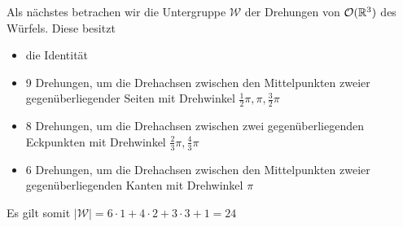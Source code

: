 Als nächstes betrachen wir die Untergruppe $\mathcal{W}$ der Drehungen von ${\mathcal{O}(\mathbb{R}^3)}$ des Würfels. Diese besitzt
\begin{itemize} 
  \item die Identität
  \item 9 Drehungen, um die Drehachsen zwischen den Mittelpunkten zweier gegenüberliegender Seiten mit Drehwinkel $\frac{1}{2}\pi,\pi,\frac{3}{2}\pi$
  \item 8 Drehungen, um die Drehachsen zwischen zwei gegenüberliegenden Eckpunkten mit Drehwinkel $\frac{2}{3}\pi,\frac{4}{3}\pi$
  \item 6 Drehungen, um die Drehachsen zwischen den Mittelpunkten zweier gegenüberliegenden Kanten mit Drehwinkel $\pi$
\end{itemize}
Es gilt somit $|\mathcal{W}|=6 \cdot 1 + 4 \cdot 2 + 3 \cdot 3 +1 = 24$

